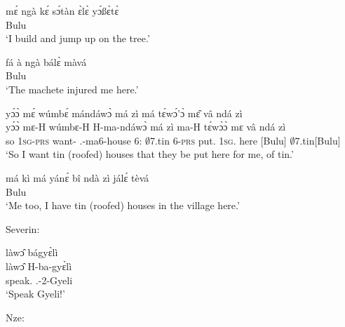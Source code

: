 \begin{exe}[(C234)]
\exC\label{29}
  \gll    mɛ́ ngà kɛ́ sɔ́tàn ɛ̀lɛ̀ yɔ́ßɛ̀tɛ̀  \\
              [1\textsc{sg} build go jump tree top]Bulu \\
    \trans `I build and jump up on the tree.'
 
\exC\label{30}
  \gll     fá à ngà bálɛ̀ màvá \\
             [machete 3\textsc{sg} 1\textsc{sg} hurt here]Bulu \\
    \trans `The machete injured me here.'
 
\exC\label{31}
  \glll     yɔ́ɔ̀ mɛ́ wúmbɛ́ mándáwɔ̀ má zì má tɛ́wɔ́'ɔ̀ mɛ̂ vâ ndá zì \\
            yɔ́ɔ̀ mɛ-H wúmbɛ-H H-ma-ndáwɔ̀ má zì ma-H tɛ́wɔ̀ɔ̀ mɛ vâ ndá zì \\
              so 1\textsc{sg}-\textsc{prs} want-{\R} {\OBJ}.{\LINK}-ma6-house 6:{\ATT}  $\emptyset$7.tin 6-\textsc{prs} put.{\SBJV}  1\textsc{sg}.{\OBJ} here {\ATT}[Bulu] $\emptyset$7.tin[Bulu]\\
    \trans `So I want tin (roofed) houses that they be put here for me, of tin.'
 
\exC\label{32}
  \gll   má kì má yánɛ́ bî ndà zì jálɛ́ tèvá \\
             [1\textsc{sg} too 1\textsc{sg} have houses {\ATT} tin village {\ATT} here]Bulu\\
    \trans `Me too, I have tin (roofed) houses in the village here.'
\end{exe}

\noindent Severin:

\begin{exe}[(C234)]  
\exC\label{33}
  \glll    làwɔ̂ bágyɛ̀lì \\
           làwɔ̂ H-ba-gyɛ̀lì \\
            speak.{\IMP}  {\OBJ}.{\LINK}-2-Gyeli \\
    \trans `Speak Gyeli!'
\end{exe}

\noindent Nze:

